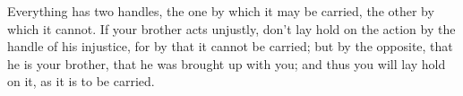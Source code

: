 Everything has two  handles, the one by  which it may be carried,  the other by
which it cannot. If your brother acts unjustly, don't lay hold on the action by
the handle  of his  injustice, for  by that it  cannot be  carried; but  by the
opposite, that he  is your brother, that  he was brought up with  you; and thus
you will lay hold on it, as it is to be carried.
